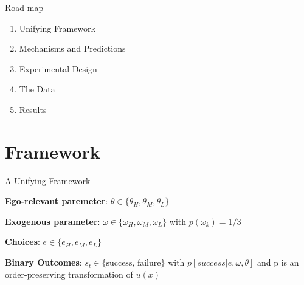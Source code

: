 \documentclass[aspectratio=169]{beamer}
\begin{document}
\begin{frame}{Road-map}
    \begin{enumerate}
        \item Unifying Framework\\
        \bigskip
        \item Mechanisms and Predictions\\
        \bigskip
        \item Experimental Design\\
        \bigskip
        \item The Data\\
        \bigskip
        \item Results\\
    \end{enumerate}
\end{frame}

\section*{Framework}

\begin{frame}{A Unifying Framework}

\textbf{Ego-relevant paremeter}: $\theta \in \{\theta_H, \theta_M, \theta_L\}$\\
\bigskip

\textbf{Exogenous parameter}: $\omega \in \{\omega_H, \omega_M, \omega_L\}$
with $p(\omega_k)=1/3$ \\
\bigskip

\textbf{Choices}: $e \in \{e_H, e_M, e_L\}$\\
\bigskip

\textbf{Binary Outcomes}: $s_t \in\{\text{success, failure}\}$ with  $p\left[success|e, \omega, \theta\right]$ and p is an order-preserving transformation of $u(x)$


\end{frame}
\end{document}
